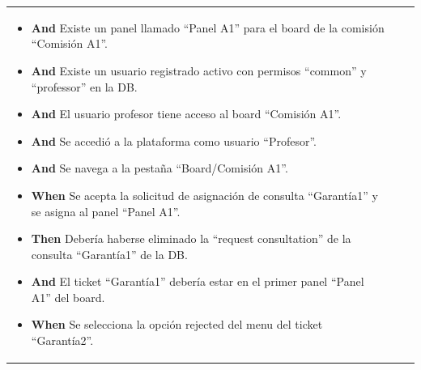 \begin{longtable}{|p{1cm}|p{2.5cm}|p{12cm}|}
\begin{itemize}
        \item \textbf{And} Existe un panel llamado ``Panel A1'' para el board de la comisión ``Comisión A1''.
        \item \textbf{And} Existe un usuario registrado activo con permisos ``common'' y ``professor'' en la DB.
        \item \textbf{And} El usuario profesor tiene acceso al board ``Comisión A1''.
        \item \textbf{And} Se accedió a la plataforma como usuario ``Profesor''.
        \item \textbf{And} Se navega a la pestaña ``Board/Comisión A1''.
        \newline
        \item \textbf{When} Se acepta la solicitud de asignación de consulta ``Garant\'ia1'' y se asigna al panel ``Panel A1''.
        \newline
        
        \item \textbf{Then} Debería haberse eliminado la ``request consultation'' de la consulta ``Garant\'ia1'' de la DB.
        \item \textbf{And} El ticket ``Garant\'ia1'' debería estar en el primer panel ``Panel A1'' del board.
        \newline
        
        \item \textbf{When} Se selecciona la opción rejected del menu del ticket ``Garant\'ia2''.
        \newline


\end{itemize}
\end{longtable}
